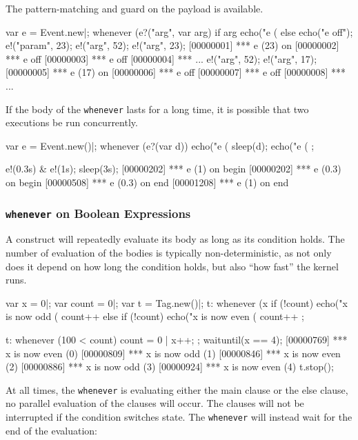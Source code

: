 The pattern-matching and guard on the payload is available.

\begin{urbiunchecked}[firstnumber=1]
var e = Event.new|;
whenever (e?("arg", var arg) if arg %
  echo("e (%
else
  echo("e off");
e!("param", 23);
e!("arg", 52);
e!("arg", 23);
[00000001] *** e (23) on
[00000002] *** e off
[00000003] *** e off
[00000004] *** ...
e!("arg", 52);
e!("arg", 17);
[00000005] *** e (17) on
[00000006] *** e off
[00000007] *** e off
[00000008] *** ...
\end{urbiunchecked}


If the body of the \lstinline{whenever} lasts for a long time, it is
possible that two executions be run concurrently.

\begin{urbiscript}[firstnumber=1]
var e = Event.new()|;
whenever (e?(var d))
{
  echo("e (%
  sleep(d);
  echo("e (%
};

e!(0.3s) & e!(1s);
sleep(3s);
[00000202] *** e (1) on begin
[00000202] *** e (0.3) on begin
[00000508] *** e (0.3) on end
[00001208] *** e (1) on end
\end{urbiscript}

\subsubsection{\lstinline{whenever} on Boolean Expressions}

A  construct will repeatedly evaluate its body as long as
its condition holds.  The number of evaluation of the bodies is typically
non-deterministic, as not only does it depend on how long the condition
holds, but also ``how fast'' the \urbi kernel runs.

\begin{urbiscript}[firstnumber=1]
var x = 0|;
var count = 0|;
var t = Tag.new()|;
t:
  whenever (x %
  {
    if (!count)
      echo("x is now odd (%
    count++
  }
  else
  {
    if (!count)
      echo("x is now even (%
    count++
  };

t:
  whenever (100 < count)
  {
    count = 0 |
    x++;
  };
waituntil(x == 4);
[00000769] *** x is now even (0)
[00000809] *** x is now odd (1)
[00000846] *** x is now even (2)
[00000886] *** x is now odd (3)
[00000924] *** x is now even (4)
t.stop();
\end{urbiscript}


At all times, the \lstinline{whenever} is evaluating either the main
clause or the else clause, no parallel evaluation of the clauses will occur.
The clauses will not be interrupted if the condition switches state. The
\lstinline{whenever} will instead wait for the end of the evaluation:

